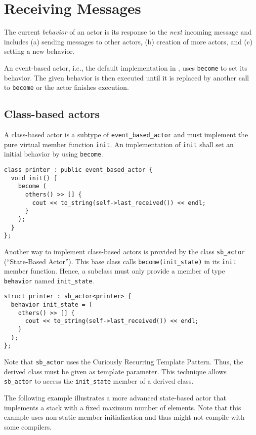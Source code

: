 \section{Receiving Messages}
\label{Sec::Receive}

The current \textit{behavior} of an actor is its response to the \textit{next} incoming message and includes (a) sending messages to other actors, (b) creation of more actors, and (c) setting a new behavior.

An event-based actor, i.e., the default implementation in \libcppa, uses \lstinline^become^ to set its behavior.
The given behavior is then executed until it is replaced by another call to \lstinline^become^ or the actor finishes execution.

\subsection{Class-based actors}

A class-based actor is a subtype of \lstinline^event_based_actor^ and must implement the pure virtual member function \lstinline^init^.
An implementation of \lstinline^init^ shall set an initial behavior by using \lstinline^become^.

\begin{lstlisting}
class printer : public event_based_actor {
  void init() {
    become (
      others() >> [] {
        cout << to_string(self->last_received()) << endl;
      }
    );
  }
};
\end{lstlisting}

Another way to implement class-based actors is provided by the class \lstinline^sb_actor^ (``State-Based Actor'').
This base class calls \lstinline^become(init_state)^ in its \lstinline^init^ member function.
Hence, a subclass must only provide a member of type \lstinline^behavior^ named \lstinline^init_state^.

\begin{lstlisting}
struct printer : sb_actor<printer> {
  behavior init_state = (
    others() >> [] {
      cout << to_string(self->last_received()) << endl;
    }
  );
};
\end{lstlisting}

Note that \lstinline^sb_actor^ uses the Curiously Recurring Template Pattern. Thus, the derived class must be given as template parameter.
This technique allows \lstinline^sb_actor^ to access the \lstinline^init_state^ member of a derived class.

The following example illustrates a more advanced state-based actor that implements a stack with a fixed maximum number of elements.
Note that this example uses non-static member initialization and thus might not compile with some compilers.

